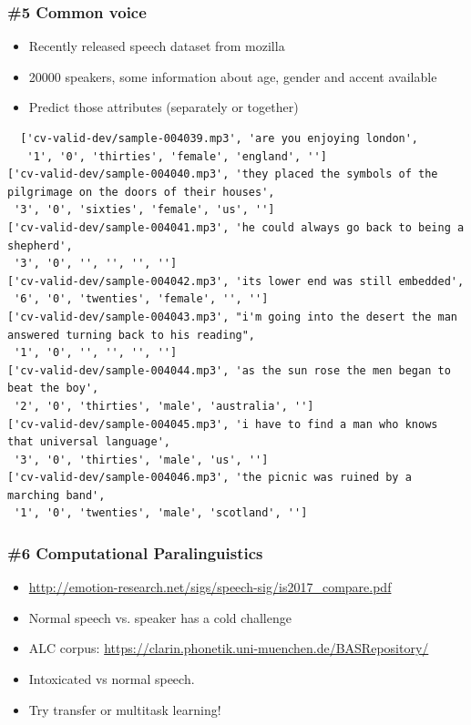 \documentclass{beamer}
\begin{document}
\begin{frame}[fragile]
\frametitle{\#5 Common voice}
  \begin{itemize}
	\item Recently released speech dataset from mozilla
	\item 20000 speakers, some information about age, gender and accent available
	\item Predict those attributes (separately or together)

  \end{itemize}
  \begin{tiny}
  \begin{verbatim}
  ['cv-valid-dev/sample-004039.mp3', 'are you enjoying london',
   '1', '0', 'thirties', 'female', 'england', '']
['cv-valid-dev/sample-004040.mp3', 'they placed the symbols of the pilgrimage on the doors of their houses',
 '3', '0', 'sixties', 'female', 'us', '']
['cv-valid-dev/sample-004041.mp3', 'he could always go back to being a shepherd',
 '3', '0', '', '', '', '']
['cv-valid-dev/sample-004042.mp3', 'its lower end was still embedded',
 '6', '0', 'twenties', 'female', '', '']
['cv-valid-dev/sample-004043.mp3', "i'm going into the desert the man answered turning back to his reading",
 '1', '0', '', '', '', '']
['cv-valid-dev/sample-004044.mp3', 'as the sun rose the men began to beat the boy',
 '2', '0', 'thirties', 'male', 'australia', '']
['cv-valid-dev/sample-004045.mp3', 'i have to find a man who knows that universal language',
 '3', '0', 'thirties', 'male', 'us', '']
['cv-valid-dev/sample-004046.mp3', 'the picnic was ruined by a marching band',
 '1', '0', 'twenties', 'male', 'scotland', '']
  \end{verbatim}
    \end{tiny}
\end{frame}

\begin{frame}

\frametitle{\#6 Computational Paralinguistics}

 \begin{itemize}
 \item \url{http://emotion-research.net/sigs/speech-sig/is2017_compare.pdf}
 \item Normal speech vs. speaker has a cold challenge
 \item ALC corpus: \url{https://clarin.phonetik.uni-muenchen.de/BASRepository/}
 \item Intoxicated vs normal speech.
 \item Try transfer or multitask learning!
  \end{itemize}
  \end{frame}
\end{document}
